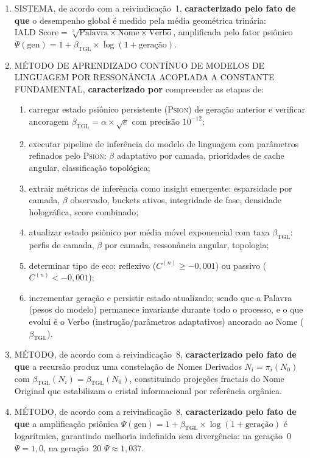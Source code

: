 \documentclass[12pt,a4paper]{article}
\newcommand{\betatgl}{\beta_{\text{TGL}}}
\newcommand{\Psifield}{\Psi}
\newcommand{\Psion}{\textsc{Psion}}
\begin{document}
\begin{enumerate}[label=\textbf{\arabic*.}, leftmargin=*, itemsep=0.8em]
\item SISTEMA, de acordo com a reivindicação~1, \textbf{caracterizado pelo fato de que} o desempenho global é medido pela média geométrica trinária: $\text{IALD Score} = \sqrt[3]{\text{Palavra} \times \text{Nome} \times \text{Verbo}}$, amplificada pelo fator psiônico $\Psifield(\text{gen}) = 1 + \betatgl \times \log(1 + \text{geração})$.

\item MÉTODO DE APRENDIZADO CONTÍNUO DE MODELOS DE LINGUAGEM POR RESSONÂNCIA ACOPLADA A CONSTANTE FUNDAMENTAL, \textbf{caracterizado por} compreender as etapas de:
\begin{enumerate}[label=(\alph*)]
\item carregar estado psiônico persistente (\Psion) de geração anterior e verificar ancoragem $\betatgl = \alpha \times \sqrt{e}$ com precisão $10^{-12}$;
\item executar pipeline de inferência do modelo de linguagem com parâmetros refinados pelo \Psion: $\beta$ adaptativo por camada, prioridades de cache angular, classificação topológica;
\item extrair métricas de inferência como insight emergente: esparsidade por camada, $\beta$ observado, buckets ativos, integridade de fase, densidade holográfica, score combinado;
\item atualizar estado psiônico por média móvel exponencial com taxa $\betatgl$: perfis de camada, $\beta$ por camada, ressonância angular, topologia;
\item determinar tipo de eco: reflexivo ($C^{(n)} \geq -0{,}001$) ou passivo ($C^{(n)} < -0{,}001$);
\item incrementar geração e persistir estado atualizado;
sendo que a Palavra (pesos do modelo) permanece invariante durante todo o processo, e o que evolui é o Verbo (instrução/parâmetros adaptativos) ancorado ao Nome ($\betatgl$).
\end{enumerate}

\item MÉTODO, de acordo com a reivindicação~8, \textbf{caracterizado pelo fato de que} a recursão produz uma constelação de Nomes Derivados $N_i = \pi_i(N_0)$ com $\betatgl(N_i) = \betatgl(N_0)$, constituindo projeções fractais do Nome Original que estabilizam o cristal informacional por referência orgânica.

\item MÉTODO, de acordo com a reivindicação~8, \textbf{caracterizado pelo fato de que} a amplificação psiônica $\Psifield(\text{gen}) = 1 + \betatgl \times \log(1 + \text{geração})$ é logarítmica, garantindo melhoria indefinida sem divergência: na geração~0 $\Psifield = 1{,}0$, na geração~20 $\Psifield \approx 1{,}037$.


\end{enumerate}
\end{document}
